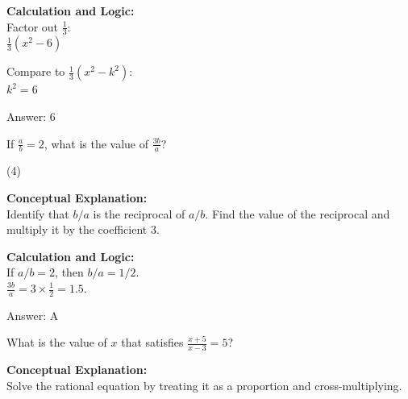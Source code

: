\documentclass[11pt,paper=a4,answers]{exam}
\begin{document}
\begin{questions}
\begin{solution}
\vspace{20pt}

\textbf{Calculation and Logic:} \\
Factor out $\frac{1}{3}$: \\
$\frac{1}{3}(x^2 - 6)$

\vspace{10pt}

Compare to $\frac{1}{3}(x^2 - k^2)$: \\
$k^2 = 6$

\vspace{25pt}

Answer: \colorbox{yellow!100}{6}
\end{solution}

\vspace{40pt}

\question
If $\frac{a}{b} = 2$, what is the value of $\frac{3b}{a}$?
\begin{tasks}(4)
\end{tasks}

\begin{solution}
\textbf{Conceptual Explanation:} \\
Identify that $b/a$ is the reciprocal of $a/b$. Find the value of the reciprocal and multiply it by the coefficient 3.

\vspace{20pt}

\textbf{Calculation and Logic:} \\
If $a/b = 2$, then $b/a = 1/2$. \\
$\frac{3b}{a} = 3 \times \frac{1}{2} = 1.5$.

\vspace{25pt}

Answer: \colorbox{yellow!100}{A}
\end{solution}

\vspace{40pt}

\question
What is the value of $x$ that satisfies $\frac{x+5}{x-3} = 5$?

\begin{solution}
\textbf{Conceptual Explanation:} \\
Solve the rational equation by treating it as a proportion and cross-multiplying.


\end{solution}
\end{questions}
\end{document}
